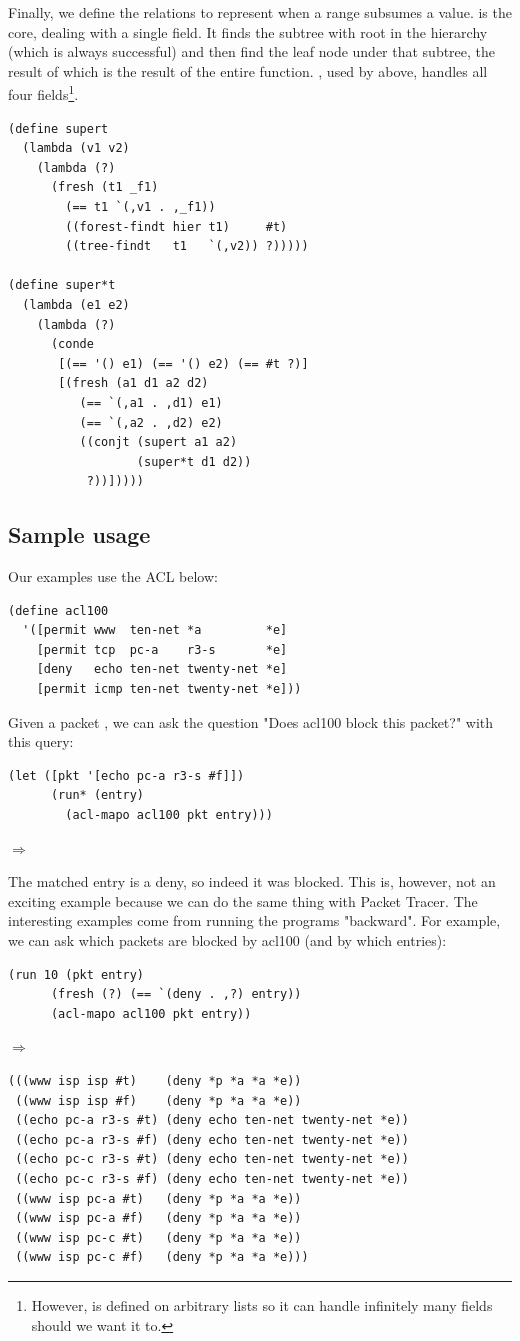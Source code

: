 Finally, we define the relations to represent when a range subsumes a value.  is the core, dealing with a single field. It finds the subtree with root  in the hierarchy (which is always successful) and then find the leaf node  under that subtree, the result of which is the result of the entire function. , used by  above, handles all four fields\footnote{However,  is defined on arbitrary lists so it can handle infinitely many fields should we want it to.}.
\begin{lstlisting}
(define supert
  (lambda (v1 v2)
    (lambda (?)
      (fresh (t1 _f1)
        (== t1 `(,v1 . ,_f1))
        ((forest-findt hier t1)     #t)
        ((tree-findt   t1   `(,v2)) ?)))))

(define super*t
  (lambda (e1 e2)
    (lambda (?)
      (conde
       [(== '() e1) (== '() e2) (== #t ?)]
       [(fresh (a1 d1 a2 d2)
          (== `(,a1 . ,d1) e1)
          (== `(,a2 . ,d2) e2)
          ((conjt (supert a1 a2)
                  (super*t d1 d2))
           ?))]))))
\end{lstlisting}

\subsection{Sample usage}
Our examples use the ACL below:
\begin{lstlisting}
(define acl100
  '([permit www  ten-net *a         *e]
    [permit tcp  pc-a    r3-s       *e]
    [deny   echo ten-net twenty-net *e]
    [permit icmp ten-net twenty-net *e]))
\end{lstlisting}

Given a packet \code{[echo pc-a r3-s #f]}, we can ask the question "Does acl100 block this packet?" with this query:
\begin{lstlisting}
(let ([pkt '[echo pc-a r3-s #f]])
      (run* (entry)
        (acl-mapo acl100 pkt entry)))
\end{lstlisting}
$\Rightarrow$ 

The matched entry is a deny, so indeed it was blocked. This is, however, not an exciting example because we can do the same thing with Packet Tracer. The interesting examples come from running the programs "backward". For example, we can ask which packets are blocked by acl100 (and by which entries):
\begin{lstlisting}
(run 10 (pkt entry)
      (fresh (?) (== `(deny . ,?) entry))
      (acl-mapo acl100 pkt entry))
\end{lstlisting}
$\Rightarrow$
\begin{lstlisting}
(((www isp isp #t)    (deny *p *a *a *e))
 ((www isp isp #f)    (deny *p *a *a *e))
 ((echo pc-a r3-s #t) (deny echo ten-net twenty-net *e))
 ((echo pc-a r3-s #f) (deny echo ten-net twenty-net *e))
 ((echo pc-c r3-s #t) (deny echo ten-net twenty-net *e))
 ((echo pc-c r3-s #f) (deny echo ten-net twenty-net *e))
 ((www isp pc-a #t)   (deny *p *a *a *e))
 ((www isp pc-a #f)   (deny *p *a *a *e))
 ((www isp pc-c #t)   (deny *p *a *a *e))
 ((www isp pc-c #f)   (deny *p *a *a *e)))
\end{lstlisting}

